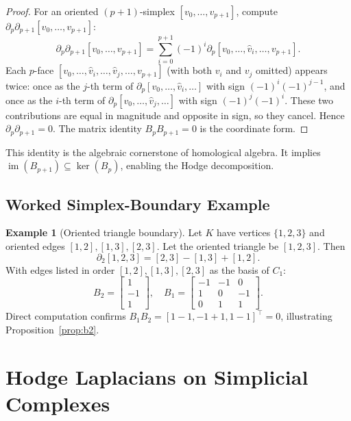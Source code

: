 \documentclass[11pt]{article}
\theoremstyle{definition}
\newtheorem{example}[theorem]{Example}
\theoremstyle{remark}
\DeclareMathOperator{\im}{im}
\begin{document}
\begin{proof}
For an oriented $(p+1)$-simplex $[v_0,\dots,v_{p+1}]$, compute
$\partial_p\partial_{p+1}[v_0,\dots,v_{p+1}]$:
\[
  \partial_p\partial_{p+1}[v_0,\dots,v_{p+1}]
  = \sum_{i=0}^{p+1}(-1)^i\partial_p[v_0,\dots,\hat{v}_i,\dots,v_{p+1}].
\]
Each $p$-face $[v_0,\dots,\hat{v}_i,\dots,\hat{v}_j,\dots,v_{p+1}]$ (with both
$v_i$ and $v_j$ omitted) appears twice: once as the $j$-th term of
$\partial_p[v_0,\dots,\hat{v}_i,\dots]$ with sign $(-1)^i(-1)^{j-1}$, and
once as the $i$-th term of $\partial_p[v_0,\dots,\hat{v}_j,\dots]$ with sign
$(-1)^j(-1)^i$. These two contributions are equal in magnitude and opposite in
sign, so they cancel. Hence $\partial_p\partial_{p+1}=0$. The matrix identity
$B_pB_{p+1}=0$ is the coordinate form.
\end{proof}

This identity is the algebraic cornerstone of homological algebra. It implies
$\im(B_{p+1})\subseteq\ker(B_p)$, enabling the Hodge decomposition.

\subsection{Worked Simplex-Boundary Example}

\begin{example}[Oriented triangle boundary]
\label{ex:boundary}
Let $K$ have vertices $\{1,2,3\}$ and oriented edges
$[1,2],[1,3],[2,3]$. Let the oriented triangle be $[1,2,3]$. Then
\[
  \partial_2[1,2,3] = [2,3] - [1,3] + [1,2].
\]
With edges listed in order $[1,2],[1,3],[2,3]$ as the basis of $C_1$:
\[
  B_2 = \begin{bmatrix} 1 \\ -1 \\ 1 \end{bmatrix},\quad
  B_1 = \begin{bmatrix} -1 & -1 & 0 \\ 1 & 0 & -1 \\ 0 & 1 & 1 \end{bmatrix}.
\]
Direct computation confirms $B_1 B_2 = [1-1, -1+1, 1-1]^\top = 0$,
illustrating Proposition~\ref{prop:b2}.
\end{example}


\section{Hodge Laplacians on Simplicial Complexes}
\label{sec:hodge}
\end{document}
